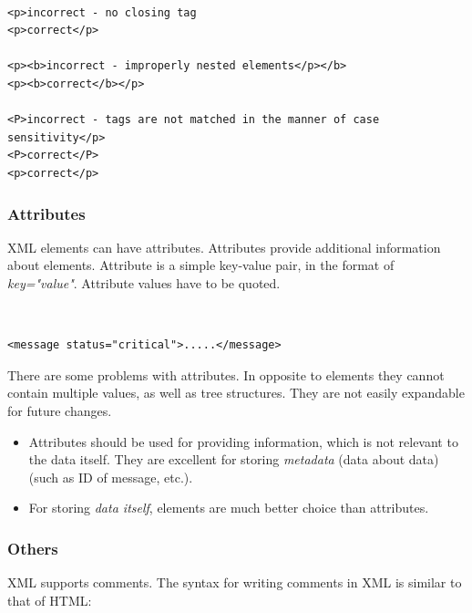 {\tt \small
\begin{verbatim}
<p>incorrect - no closing tag
<p>correct</p>

<p><b>incorrect - improperly nested elements</p></b>
<p><b>correct</b></p>

<P>incorrect - tags are not matched in the manner of case sensitivity</p>
<P>correct</P>
<p>correct</p>
\end{verbatim}
}

\subsubsection{Attributes}
\label{sss:xmlAttributes}

XML elements can have attributes. Attributes provide additional information about elements. Attribute is a simple key-value pair, in the format of \textit{key="value"}. Attribute values have to be quoted.

{\tt \small
\begin{verbatim}
<message status="critical">.....</message>
\end{verbatim}
}

\noindent There are some problems with attributes. In opposite to elements they cannot contain multiple values, as well as tree structures. They are not easily expandable for future changes. 

\begin{framed}
\begin{itemize}
    \setlength{\itemsep}{0cm}
    \setlength{\parskip}{0cm}

    \item Attributes should be used for providing information, which is not relevant to the data itself. They are excellent for storing \textit{metadata} (data about data) (such as ID of message, etc.).
    \item For storing \textit{data itself}, elements are much better choice than attributes.
\end{itemize}
\end{framed}
\setlist{} %

\newpage

\subsubsection{Others}
\label{sss:xmlOthers}

XML supports comments. The syntax for writing comments in XML is similar to that of HTML:

